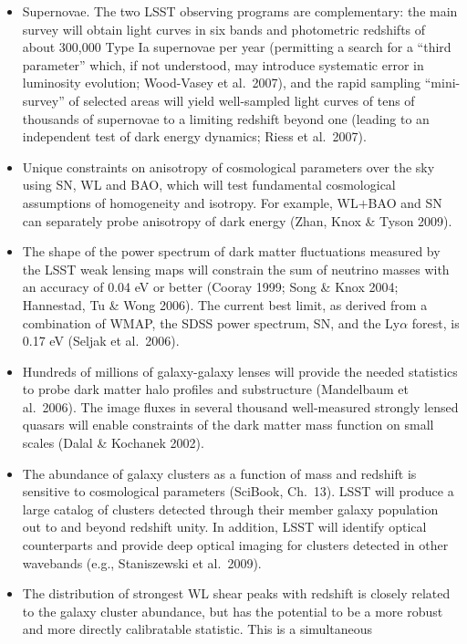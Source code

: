 \begin{itemize}
\item Supernovae. The two LSST observing programs are complementary: the main survey will 
obtain light curves in six bands and photometric redshifts of about 300,000 Type
Ia supernovae per year (permitting a search for a ``third parameter'' which,
if not understood, may introduce systematic error in luminosity evolution; 
Wood-Vasey et al.~2007), and the rapid sampling ``mini-survey'' of selected
areas will yield well-sampled light curves of tens of thousands of supernovae
to a limiting redshift beyond one (leading to an independent test of dark energy 
dynamics; Riess et al.~2007). 
\item Unique constraints on anisotropy of cosmological parameters over the sky using
SN, WL and BAO, which will test fundamental cosmological assumptions of homogeneity and isotropy.
For example, WL$+$BAO and SN can separately probe anisotropy of dark energy (Zhan, Knox \& Tyson 2009).
\item The shape of the power spectrum of dark matter fluctuations measured by
the LSST weak lensing maps will constrain the sum of neutrino masses with an accuracy 
of 0.04 eV or better (Cooray 1999; Song \& Knox 2004; Hannestad, Tu \& Wong 2006). 
The current best limit, as derived from a combination of WMAP, the SDSS power spectrum, 
SN, and the Ly$\alpha$ forest, is 0.17 eV (Seljak et al.~2006).
\item Hundreds of millions of galaxy-galaxy lenses will provide the needed statistics to probe dark matter 
halo profiles and substructure (Mandelbaum et al.~2006). The image fluxes in several thousand well-measured
strongly lensed quasars will enable constraints of the dark matter mass function on small scales (Dalal \& Kochanek 2002).
\item The abundance of galaxy clusters as a function of mass and redshift is sensitive to cosmological parameters
(SciBook, Ch.~13). LSST will produce a large catalog of clusters detected through their member galaxy population 
out to and beyond redshift unity.  In addition, LSST will identify optical counterparts and provide deep optical
imaging for clusters detected in other wavebands (e.g., Staniszewski et al.~2009). 
\item The distribution of strongest WL shear peaks with redshift is
  closely related to the galaxy cluster abundance, but has the
  potential to be a more robust and more directly calibratable statistic. This is a simultaneous 

\end{itemize}
